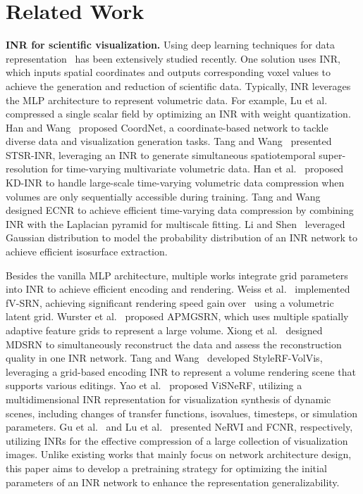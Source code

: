 \section{Related Work}
\vspace{-0.025in}

{\bf INR for scientific visualization.}
Using deep learning techniques for data representation~\cite{Wang-DL4SciVis} has been extensively studied recently. 
One solution uses INR, which inputs spatial coordinates and outputs corresponding voxel values to achieve the generation and reduction of scientific data. 
Typically, INR leverages the MLP architecture to represent volumetric data.
For example, Lu et al.\ \cite{Lu-neurcomp} compressed a single scalar field by optimizing an INR with weight quantization.
Han and Wang~\cite{Han-TVCG23} proposed CoordNet, a coordinate-based network to tackle diverse data and visualization generation tasks.
Tang and Wang~\cite{Tang-CG24} presented STSR-INR, leveraging an INR to generate simultaneous spatiotemporal super-resolution for time-varying multivariate volumetric data.
Han et al.\ \cite{Han-KD-INR} proposed KD-INR to handle large-scale time-varying volumetric data compression when volumes are only sequentially accessible during training.
Tang and Wang~\cite{Tang-PVIS24} designed ECNR to achieve efficient time-varying data compression by combining INR with the Laplacian pyramid for multiscale fitting.
Li and Shen~\cite{Li-TVCG24} leveraged Gaussian distribution to model the probability distribution of an INR network to achieve efficient isosurface extraction.

Besides the vanilla MLP architecture, multiple works integrate grid parameters into INR to achieve efficient encoding and rendering.
Weiss et al.\ \cite{Weiss-CGF22} implemented fV-SRN, achieving significant rendering speed gain over~\cite{Lu-neurcomp} using a volumetric latent grid.
Wurster et al.\ \cite{Wurster-TVCG24} proposed APMGSRN, which uses multiple spatially adaptive feature grids to represent a large volume.
Xiong et al.\ \cite{Xiong-TVCG24} designed MDSRN to simultaneously reconstruct the data and assess the reconstruction quality in one INR network.
Tang and Wang~\cite{Tang-VIS24} developed StyleRF-VolVis, leveraging a grid-based encoding INR to represent a volume rendering scene that supports various editings.
Yao et al.\ \cite{Yao-PVIS25} proposed ViSNeRF, utilizing a multidimensional INR representation for visualization synthesis of dynamic scenes, including changes of transfer functions, isovalues, timesteps, or simulation parameters. 
Gu et al.\ \cite{Gu-CG23} and Lu et al.\ \cite{YF-Lu-VISSP24} presented NeRVI and FCNR, respectively, utilizing INRs for the effective compression of a large collection of visualization images. 
%
Unlike existing works that mainly focus on network architecture design, this paper aims to develop a pretraining strategy for optimizing the initial parameters of an INR network to enhance the representation generalizability.

